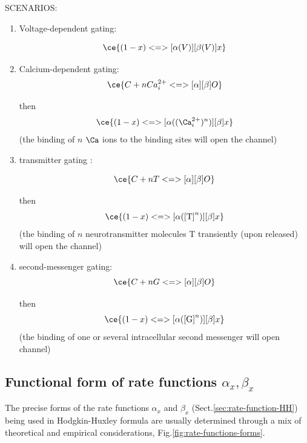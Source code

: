 SCENARIOS:
\begin{enumerate}
\item Voltage-dependent gating:

\begin{equation*}
\ce{(1-x) <=>[\alpha(V)][\beta(V)] x}
\end{equation*}


\item Calcium-dependent gating:
\begin{equation*}
\ce{C + nCa_i^{2+}  <=>[\alpha][\beta] O}
\end{equation*}

then
\begin{equation}
\ce{(1-x) <=>[\alpha((\Ca_i^{2+})^n)][\beta] x}
\end{equation}
(the binding of $n$ $\Ca$ ions to the binding sites will open the channel)

\item transmitter gating :

\begin{equation*}
\ce{C + nT <=>[\alpha][\beta] O}
\end{equation*}

then
\begin{equation}
\ce{(1-x)  <=>[\alpha(\text{[T]}^n)][\beta] x}
\end{equation}
(the binding of $n$ neurotransmitter molecules T transiently (upon released)
will open the channel)

\item second-messenger gating:
\begin{equation*}
\ce{C + nG <=>[\alpha][\beta] O}
\end{equation*}

then
\begin{equation}
\ce{(1-x) <=>[\alpha(\text{[G]}^n)][\beta] x}
\end{equation}
(the binding of one or several intracellular second messenger will open channel)

\end{enumerate}




\subsection{Functional form of rate functions $\alpha_x, \beta_x$}
\label{sec:rate-functions}

The precise forms of the rate functions $\alpha_x$ and $\beta_x$
(Sect.\ref{sec:rate-function-HH}) being used in Hodgkin-Huxley formula are
usually determined through a mix of theoretical and empirical considerations,
Fig.\ref{fig:rate-functions-forms}.

